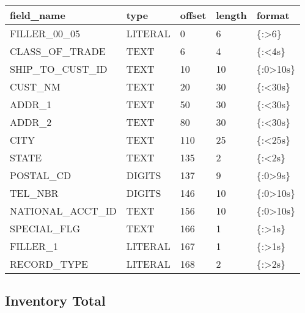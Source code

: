 \documentclass[letterpaper,10pt,english]{sphinxmanual}
\begin{document}
\begin{savenotes}\sphinxattablestart
\centering
\begin{tabulary}{\linewidth}[t]{|T|T|T|T|T|}
\hline
\sphinxstyletheadfamily 
field\_name
&\sphinxstyletheadfamily 
type
&\sphinxstyletheadfamily 
offset
&\sphinxstyletheadfamily 
length
&\sphinxstyletheadfamily 
format
\\
\hline
FILLER\_00\_05
&
LITERAL
&
0
&
6
&
\{:\textgreater{}6\}
\\
\hline
CLASS\_OF\_TRADE
&
TEXT
&
6
&
4
&
\{:\textless{}4s\}
\\
\hline
SHIP\_TO\_CUST\_ID
&
TEXT
&
10
&
10
&
\{:0\textgreater{}10s\}
\\
\hline
CUST\_NM
&
TEXT
&
20
&
30
&
\{:\textless{}30s\}
\\
\hline
ADDR\_1
&
TEXT
&
50
&
30
&
\{:\textless{}30s\}
\\
\hline
ADDR\_2
&
TEXT
&
80
&
30
&
\{:\textless{}30s\}
\\
\hline
CITY
&
TEXT
&
110
&
25
&
\{:\textless{}25s\}
\\
\hline
STATE
&
TEXT
&
135
&
2
&
\{:\textless{}2s\}
\\
\hline
POSTAL\_CD
&
DIGITS
&
137
&
9
&
\{:0\textgreater{}9s\}
\\
\hline
TEL\_NBR
&
DIGITS
&
146
&
10
&
\{:0\textgreater{}10s\}
\\
\hline
NATIONAL\_ACCT\_ID
&
TEXT
&
156
&
10
&
\{:0\textgreater{}10s\}
\\
\hline
SPECIAL\_FLG
&
TEXT
&
166
&
1
&
\{:\textgreater{}1s\}
\\
\hline
FILLER\_1
&
LITERAL
&
167
&
1
&
\{:\textgreater{}1s\}
\\
\hline
RECORD\_TYPE
&
LITERAL
&
168
&
2
&
\{:\textgreater{}2s\}
\\
\hline
\end{tabulary}
\par
\sphinxattableend\end{savenotes}


\subsection{Inventory Total}
\label{\detokenize{cds_record_layout:inventory-total}}
\end{document}
